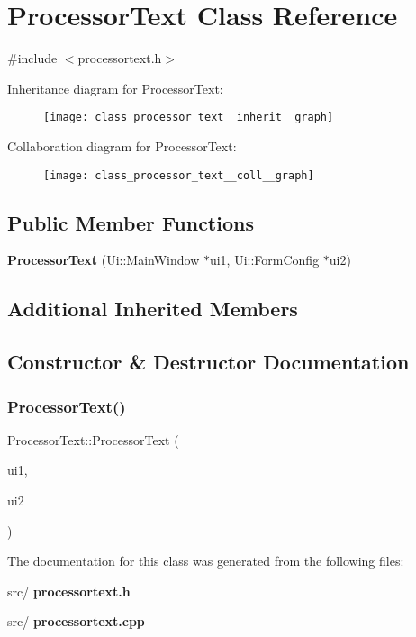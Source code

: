\section{Processor\+Text Class Reference}
\label{class_processor_text}


{\ttfamily \#include $<$processortext.\+h$>$}



Inheritance diagram for Processor\+Text\+:\nopagebreak
\begin{figure}[H]
\begin{center}
\leavevmode
\texttt{[image: class\_processor\_text\_\_inherit\_\_graph]}
\end{center}
\end{figure}


Collaboration diagram for Processor\+Text\+:\nopagebreak
\begin{figure}[H]
\begin{center}
\leavevmode
\texttt{[image: class\_processor\_text\_\_coll\_\_graph]}
\end{center}
\end{figure}
\subsection*{Public Member Functions}
\begin{DoxyCompactItemize}
\item 
\textbf{ Processor\+Text} (Ui\+::\+Main\+Window $\ast$ui1, Ui\+::\+Form\+Config $\ast$ui2)
\end{DoxyCompactItemize}
\subsection*{Additional Inherited Members}


\subsection{Constructor \& Destructor Documentation}
\mbox{\label{class_processor_text_a2583dadf1d49b0e912f8ad7dc90aee2c}} 
\subsubsection{Processor\+Text()}
{\footnotesize\ttfamily Processor\+Text\+::\+Processor\+Text (\begin{DoxyParamCaption}\item[{Ui\+::\+Main\+Window $\ast$}]{ui1,  }\item[{Ui\+::\+Form\+Config $\ast$}]{ui2 }\end{DoxyParamCaption})}



The documentation for this class was generated from the following files\+:\begin{DoxyCompactItemize}
\item 
src/\textbf{ processortext.\+h}\item 
src/\textbf{ processortext.\+cpp}\end{DoxyCompactItemize}
